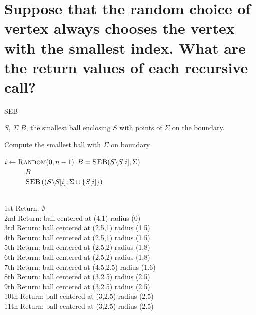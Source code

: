 \documentclass[10pt,letterpaper]{article}
\begin{document}
\section{Suppose that the random choice of vertex always chooses the vertex with the smallest index. What are the return values of each recursive call?}
  \begin{algorithm}\caption{\textsc{SEB}}\label{alg:seb}
 \begin{algorithmic}[1]
    $S$, $\Sigma$
    $B$, the smallest ball enclosing $S$ with points of 
$\Sigma$ on the boundary.
   \State ~

   \State Compute the smallest ball with $\Sigma$ on boundary
   \EndIf
   
   \State $i \gets \textsc{Random}(0,n-1)$
   \State $B = \textsc{SEB}(S \backslash S[i], \Sigma)$
   \\
   ~~~~~~\Return $B$
   \Else\\
   ~~~~~~\Return $\textsc{SEB}\left((S \backslash S[i], \Sigma \cup \{ S[i] 
\}\right)$
   \EndIf
 \end{algorithmic}
\end{algorithm}
~~~
\\
1st Return: $\emptyset$\\
2nd Return: ball centered at (4,1) radius (0)\\
3rd Return: ball centered at (2.5,1) radius (1.5)\\
4th Return: ball centered at (2.5,1) radius (1.5)\\
5th Return: ball centered at (2.5,2) radius (1.8)\\
6th Return: ball centered at (2.5,2) radius (1.8)\\
7th Return: ball centered at (4.5,2.5) radius (1.6)\\
8th Return: ball centered at (3,2.5) radius (2.5)\\
9th Return: ball centered at (3,2.5) radius (2.5)\\
10th Return: ball centered at (3,2.5) radius (2.5)\\
11th Return: ball centered at (3,2.5) radius (2.5)\\
\end{document}
